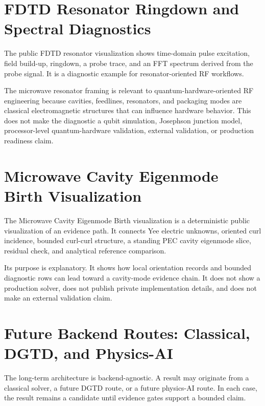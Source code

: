 \documentclass[11pt,a4paper]{article}
\begin{document}
\section{FDTD Resonator Ringdown and Spectral Diagnostics}

The public FDTD resonator visualization shows time-domain pulse excitation, field build-up, ringdown, a probe trace, and an FFT spectrum derived from the probe signal. It is a diagnostic example for resonator-oriented RF workflows.

The microwave resonator framing is relevant to quantum-hardware-oriented RF engineering because cavities, feedlines, resonators, and packaging modes are classical electromagnetic structures that can influence hardware behavior. This does not make the diagnostic a qubit simulation, Josephson junction model, processor-level quantum-hardware validation, external validation, or production readiness claim.

\section{Microwave Cavity Eigenmode Birth Visualization}

The Microwave Cavity Eigenmode Birth visualization is a deterministic public visualization of an evidence path. It connects Yee electric unknowns, oriented curl incidence, bounded curl-curl structure, a standing PEC cavity eigenmode slice, residual check, and analytical reference comparison.

Its purpose is explanatory. It shows how local orientation records and bounded diagnostic rows can lead toward a cavity-mode evidence chain. It does not show a production solver, does not publish private implementation details, and does not make an external validation claim.

\section{Future Backend Routes: Classical, DGTD, and Physics-AI}

The long-term architecture is backend-agnostic. A result may originate from a classical solver, a future DGTD route, or a future physics-AI route. In each case, the result remains a candidate until evidence gates support a bounded claim.
\end{document}
